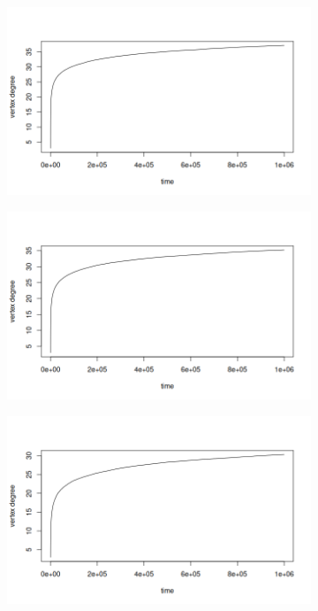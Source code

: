 \begin{figure}[ht]
\centering
\begin{subfigure}{.5\textwidth}
  \centering
  \includegraphics[width=\linewidth]{figures/scaling_RA/sc_ra_0.png}
\end{subfigure}%
\begin{subfigure}{.5\textwidth}
  \centering
  \includegraphics[width=\linewidth]{figures/scaling_RA/sc_ra_1.png}
\end{subfigure}
\begin{subfigure}{.5\textwidth}
  \centering
  \includegraphics[width=\linewidth]{figures/scaling_RA/sc_ra_2.png}

\end{subfigure}
\end{figure}
